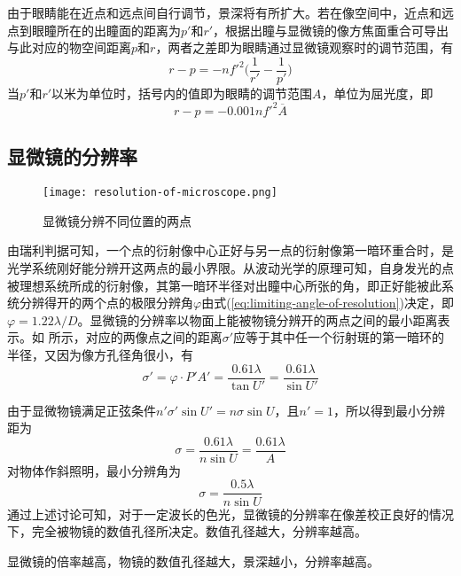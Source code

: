 \documentclass[cn,10pt,chinesefont=founder,math=newtx,cite=super,twoside]{elegantbook}
\begin{document}
由于眼睛能在近点和远点间自行调节，景深将有所扩大。若在像空间中，近点和远点到眼瞳所在的出瞳面的距离为$p'$和$r'$，根据出瞳与显微镜的像方焦面重合可导出与此对应的物空间距离$p$和$r$，两者之差即为眼睛通过显微镜观察时的调节范围，有
\begin{equation}
r-p=-nf'^2\bigg(\frac{1}{r'}-\frac{1}{p'}\bigg)
\end{equation}
当$p'$和$r'$以米为单位时，括号内的值即为眼睛的调节范围$A$，单位为屈光度，即
\begin{equation}
r-p=-0.001nf'^2\overline{A}
\end{equation}

\subsection{显微镜的分辨率}

\begin{figure}[htbp]
	\centering
	\texttt{[image: resolution-of-microscope.png]}
	\caption{显微镜分辨不同位置的两点}
	\label{fig:resolution-of-microscope}
\end{figure}

由瑞利判据可知，一个点的衍射像中心正好与另一点的衍射像第一暗环重合时，是光学系统刚好能分辨开这两点的最小界限。从波动光学的原理可知，自身发光的点被理想系统所成的衍射像，其第一暗环半径对出瞳中心所张的角，即正好能被此系统分辨得开的两个点的极限分辨角$\varphi$由式(\ref{eq:limiting-angle-of-resolution})决定，即$\varphi=1.22\lambda/D$。显微镜的分辨率以物面上能被物镜分辨开的两点之间的最小距离表示。如 所示，对应的两像点之间的距离$\sigma'$应等于其中任一个衍射斑的第一暗环的半径，又因为像方孔径角很小，有
\begin{equation}
\sigma'=\varphi\cdot P'A'=\frac{0.61\lambda}{\tan U'}=\frac{0.61\lambda}{\sin U'}
\end{equation}

由于显微物镜满足正弦条件$n'\sigma'\sin U'=n\sigma\sin U$，且$n'=1$，所以得到最小分辨距为
\begin{equation}
\sigma=\frac{0.61\lambda}{n\sin U}=\frac{0.61\lambda}{A}
\end{equation}
对物体作斜照明，最小分辨角为
\begin{equation}
\sigma=\frac{0.5\lambda}{n\sin U}
\end{equation}
通过上述讨论可知，对于一定波长的色光，显微镜的分辨率在像差校正良好的情况下，完全被物镜的数值孔径所决定。数值孔径越大，分辨率越高。
\begin{note}
	显微镜的倍率越高，物镜的数值孔径越大，景深越小，分辨率越高。
\end{note}
\end{document}
